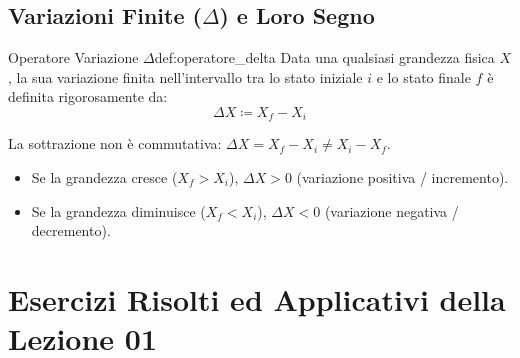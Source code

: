 \subsection{Variazioni Finite ($\Delta$) e Loro Segno}

\begin{definizione}{Operatore Variazione $\Delta$}{def:operatore_delta}
Data una qualsiasi grandezza fisica $X$, la sua variazione finita nell'intervallo tra lo stato iniziale $i$ e lo stato finale $f$ è definita rigorosamente da:
\begin{equation}
    \Delta X \coloneqq X_f - X_i
\end{equation}
\end{definizione}

\begin{esame}
La sottrazione non è commutativa: $\Delta X = X_f - X_i \neq X_i - X_f$.
\begin{itemize}
    \item Se la grandezza cresce ($X_f > X_i$), $\Delta X > 0$ (variazione positiva / incremento).
    \item Se la grandezza diminuisce ($X_f < X_i$), $\Delta X < 0$ (variazione negativa / decremento).
\end{itemize}
\end{esame}

\section{Esercizi Risolti ed Applicativi della Lezione 01}
\label{sec:esercizi_lezione_01}

